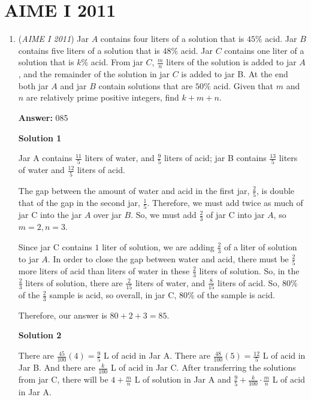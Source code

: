 \section{AIME I 2011}
        \begin{enumerate}
        	\item (\textit{AIME I 2011}) Jar $A$ contains four liters of a solution that is $45\%$ acid. Jar $B$ contains five liters of a solution that is $48\%$ acid. Jar $C$ contains one liter of a solution that is $k\%$ acid. From jar $C$, $\frac{m}{n}$ liters of the solution is added to jar $A$, and the remainder of the solution in jar $C$ is added to jar B. At the end both jar $A$ and jar $B$ contain solutions that are $50\%$ acid. Given that $m$ and $n$ are relatively prime positive integers, find $k + m + n$.


 
 \textbf{Answer: }085



\textbf{Solution 1}

Jar A contains $\frac{11}{5}$ liters of water, and $\frac{9}{5}$ liters of acid; jar B contains $\frac{13}{5}$ liters of water and $\frac{12}{5}$ liters of acid.

 The gap between the amount of water and acid in the first jar, $\frac{2}{5}$, is double that of the gap in the second jar, $\frac{1}{5}$. Therefore, we must add twice as much of jar C into the jar $A$ over jar $B$. So, we must add $\frac{2}{3}$ of jar C into jar $A$, so $m = 2, n=3$.

 Since jar C contains $1$ liter of solution, we are adding $\frac{2}{3}$ of a liter of solution to jar $A$. In order to close the gap between water and acid, there must be $\frac{2}{5}$ more liters of acid than liters of water in these $\frac{2}{3}$ liters of solution. So, in the $\frac{2}{3}$ liters of solution, there are $\frac{2}{15}$ liters of water, and $\frac{8}{15}$ liters of acid.  So, 80\% of the $\frac{2}{3}$ sample is acid, so overall, in jar C, 80\% of the sample is acid.

 Therefore, our answer is $80 + 2 + 3 = \boxed{85}$.

 



\textbf{Solution 2}

There are $\frac{45}{100}(4)=\frac{9}{5}$ L of acid in Jar A. There are $\frac{48}{100}(5)=\frac{12}{5}$ L of acid in Jar B. And there are $\frac{k}{100}$ L of acid in Jar C. After transferring the solutions from jar C, there will be
 $4+\frac{m}{n}$ L of solution in Jar A and $\frac{9}{5}+\frac{k}{100}\cdot\frac{m}{n}$ L of acid in Jar A.


\end{enumerate}
